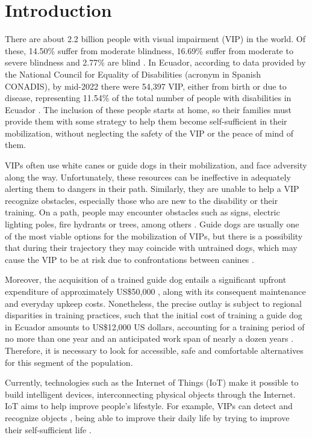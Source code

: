 \documentclass{svproc}
\begin{document}
\section{Introduction}
%
There are about 2.2 billion people with visual impairment (VIP) in the world. Of
these, 14.50\% suffer from moderate blindness, 16.69\% suffer from moderate to
severe blindness and 2.77\% are blind \cite{Pan2023}. In Ecuador, according to data provided
by the National Council for Equality of Disabilities (acronym in Spanish CONADIS), by mid-2022
there were 54,397 VIP, either from birth or due to disease, representing 11.54\% of
the total number of people with disabilities in Ecuador \cite{conadis2023}. The inclusion of these
people starts at home, so their families must provide them with some strategy
to help them become self-sufficient in their mobilization, without neglecting the
safety of the VIP or the peace of mind of them.

VIPs often use white canes or guide dogs in their mobilization, and face
adversity along the way. Unfortunately, these resources can be ineffective in
adequately alerting them to dangers in their path. Similarly, they are unable to
help a VIP recognize obstacles, especially those who are new to the disability or
their training. On a path, people may encounter obstacles such as signs, electric
lighting poles, fire hydrants or trees, among others \cite{Vorapatratorn2015}. Guide dogs are usually one of the most viable options for the mobilization of VIPs, but there is a possibility
that during their trajectory they may coincide with untrained dogs, which may
cause the VIP to be at risk due to confrontations between canines \cite{Vorapatratorn2015,Hertel2019}.

Moreover, the acquisition of a trained guide dog entails a significant upfront
expenditure of approximately US\$50,000 \cite{Williams2020}, along with its consequent maintenance
and everyday upkeep costs. Nonetheless, the precise outlay is subject to
regional disparities in training practices, such that the initial cost of training a
guide dog in Ecuador amounts to US\$12,000 US dollars, accounting for a training
period of no more than one year and an anticipated work span of nearly a dozen
years \cite{EPGE}. Therefore, it is necessary to look for accessible, safe and comfortable
alternatives for this segment of the population.

Currently, technologies such as the Internet of Things (IoT) make it possible
to build intelligent devices, interconnecting physical objects through the Internet.
IoT aims to help improve people’s lifestyle. For example, VIPs can detect
and recognize objects \cite{Leporini2022}, being able to improve their daily life by trying to
improve their self-sufficient life \cite{Gupta}.
\end{document}
